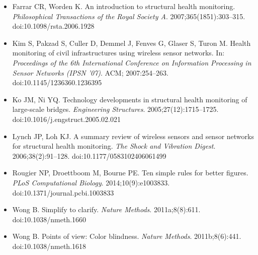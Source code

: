 {\sloppy
\begin{itemize}
\item Farrar CR, Worden K. An introduction to structural health monitoring. \textit{Philosophical Transactions of the Royal Society A}. 2007;365(1851):303--315. doi:10.1098/rsta.2006.1928
\item Kim S, Pakzad S, Culler D, Demmel J, Fenves G, Glaser S, Turon M. Health monitoring of civil infrastructures using wireless sensor networks. In: \textit{Proceedings of the 6th International Conference on Information Processing in Sensor Networks (IPSN '07)}. ACM; 2007:254--263. doi:10.1145/1236360.1236395
\item Ko JM, Ni YQ. Technology developments in structural health monitoring of large-scale bridges. \textit{Engineering Structures}. 2005;27(12):1715--1725. doi:10.1016/j.engstruct.2005.02.021
\item Lynch JP, Loh KJ. A summary review of wireless sensors and sensor networks for structural health monitoring. \textit{The Shock and Vibration Digest}. 2006;38(2):91--128. doi:10.1177/0583102406061499
\item Rougier NP, Droettboom M, Bourne PE. Ten simple rules for better figures. \textit{PLoS Computational Biology}. 2014;10(9):e1003833. doi:10.1371/journal.pcbi.1003833
\item Wong B. Simplify to clarify. \textit{Nature Methods}. 2011a;8(8):611. doi:10.1038/nmeth.1660
\item Wong B. Points of view: Color blindness. \textit{Nature Methods}. 2011b;8(6):441. doi:10.1038/nmeth.1618
\end{itemize}
\par}

